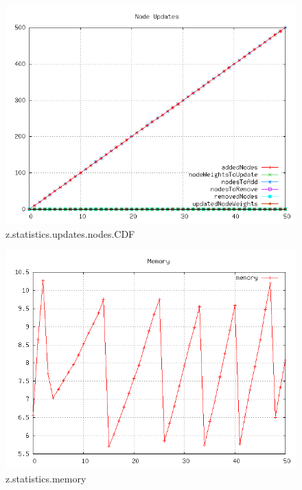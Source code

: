 \begin{figure} [h]
	\centering
	\includegraphics [scale=0.8] {plots/z.statistics.updates.nodes.CDF}
	\caption{z.statistics.updates.nodes.CDF}
	\label{plot:RANDOM_100_500 - BARABASI_ALBERT_GROWTH_10_2.z.statistics.updates.nodes.CDF}
\end{figure}

\begin{figure} [h]
	\centering
	\includegraphics [scale=0.8] {plots/z.statistics.memory}
	\caption{z.statistics.memory}
	\label{plot:RANDOM_100_500 - BARABASI_ALBERT_GROWTH_10_2.z.statistics.memory}
\end{figure}

